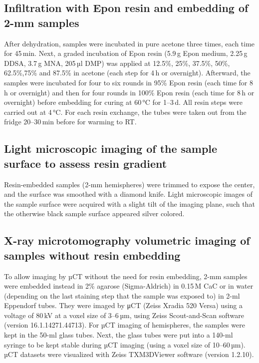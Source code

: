 \documentclass{article}
\begin{document}
\subsection*{Infiltration with Epon resin and embedding of 2-mm samples}
After dehydration, samples were incubated in pure acetone three times, each time for 45\,min. Next, a graded incubation of Epon resin (5.9\,g Epon medium, 2.25\,g DDSA, 3.7\,g MNA, 205\,µl DMP) was applied at 12.5\%, 25\%, 37.5\%, 50\%, 62.5\%,75\% and 87.5\% in acetone (each step for 4\,h or overnight). Afterward, the samples were incubated for four to six rounds in 95\% Epon resin (each time for 8\,h or overnight) and then for four rounds in 100\% Epon resin (each time for 8\,h or overnight) before embedding for curing at 60\,°C for 1–3\,d. All resin steps were carried out at 4\,°C. For each resin exchange, the tubes were taken out from the fridge 20–30\,min before for warming to RT.

\subsection*{Light microscopic imaging of the sample surface to assess resin gradient}
Resin-embedded samples (2-mm hemispheres) were trimmed to expose the center, and the surface was smoothed with a diamond knife. Light microscopic images of the sample surface were acquired with a slight tilt of the imaging plane, such that the otherwise black sample surface appeared silver colored.

\subsection*{X-ray microtomography volumetric imaging of samples without resin embedding}
To allow imaging by µCT without the need for resin embedding, 2-mm samples were embedded instead in 2\% agarose (Sigma-Aldrich) in 0.15\,M CaC or in water (depending on the last staining step that the sample was exposed to) in 2-ml Eppendorf tubes. They were imaged by μCT (Zeiss Xradia 520 Versa) using a voltage of 80\,kV at a voxel size of 3–6\,µm, using Zeiss Scout-and-Scan software (version 16.1.14271.44713). For µCT imaging of hemispheres, the samples were kept in the 50-ml glass tubes. Next, the glass tubes were put into a 140-ml syringe to be kept stable during µCT imaging (using a voxel size of 10–60\,µm). µCT datasets were visualized with Zeiss TXM3DViewer software (version 1.2.10).
\end{document}
